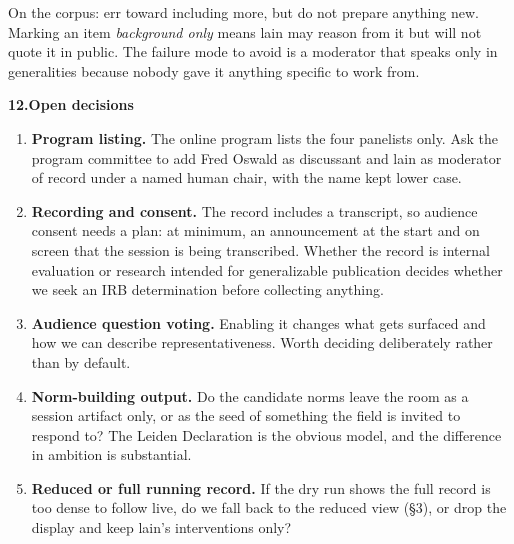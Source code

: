 \documentclass[11pt]{article}
\newcommand{\fieldlabel}[2][]{%
  \par\addvspace{1.25em}\Needspace{8\baselineskip}%
  \noindent\begin{minipage}{\linewidth}%
    {\NotoHeading\bfseries\large\color{ContentPrimary}#2}%
    \hfill{\normalfont\footnotesize\color{ContentSecondary}#1}%
  \end{minipage}\par
  \vspace{0.2em}{\color{BorderModerate}\rule{\linewidth}{0.4pt}}\par
  \vspace{0.55em}%
}
\begin{document}
\vspace{0.6em}

On the corpus: err toward including more, but do not prepare anything new.
Marking an item \emph{background only} means lain may reason from it but will
not quote it in public. The failure mode to avoid is a moderator that speaks only
in generalities because nobody gave it anything specific to work from.

\fieldlabel{12.\quad Open decisions}

\begin{enumerate}[leftmargin=1.35em]
  \item \textbf{Program listing.} The online program lists the four panelists
        only. Ask the program committee to add Fred Oswald as discussant and
        lain as moderator of record under a named human chair, with the name
        kept lower case.
  \item \textbf{Recording and consent.} The record includes a transcript, so
        audience consent needs a plan: at minimum, an announcement at the start
        and on screen that the session is being transcribed. Whether the record is internal evaluation or research
        intended for generalizable publication decides whether we seek an IRB
        determination before collecting anything.
  \item \textbf{Audience question voting.} Enabling it changes what gets
        surfaced and how we can describe representativeness. Worth deciding
        deliberately rather than by default.
  \item \textbf{Norm-building output.} Do the candidate norms leave the room as
        a session artifact only, or as the seed of something the field is
        invited to respond to? The Leiden Declaration is the obvious model, and
        the difference in ambition is substantial.
  \item \textbf{Reduced or full running record.} If the dry run shows the full
        record is too dense to follow live, do we fall back to the reduced view
        (\S3), or drop the display and keep lain's interventions only?
\end{enumerate}
\end{document}
